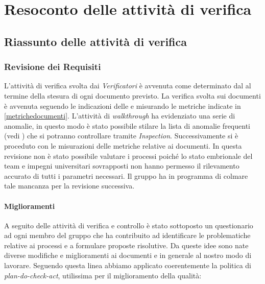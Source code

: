 \section{Resoconto delle attività di verifica}

	\subsection{Riassunto delle attività di verifica}
	\label{RiassuntoAttivitaVerifica}
	
	 	\subsubsection{Revisione dei Requisiti}
	 	L'attività di verifica svolta dai \emph{Verificatori} è avvenuta come determinato dal \PianoDiProgetto{} al termine della stesura di ogni documento previsto. La verifica svolta sui documenti è avvenuta seguendo le indicazioni delle \NormeDiProgetto{} e misurando le metriche indicate in \ref{metrichedocumenti}. L'attività di \emph{walkthrough} ha evidenziato una serie di anomalie, in questo modo è stato possibile stilare la lista di anomalie frequenti (vedi \NormeDiProgetto{}) che si potranno controllare tramite \emph{Inspection}. Successivamente si è proceduto con le misurazioni delle metriche relative ai documenti.
In questa revisione non è stato possibile valutare i processi poiché lo stato embrionale del team e   impegni universitari sovrapposti non hanno permesso il rilevamento accurato di tutti i parametri necessari. Il gruppo ha in programma di colmare tale mancanza per la revisione successiva.

		\paragraph{Miglioramenti}
		A seguito delle attività di verifica e controllo è stato sottoposto un questionario ad ogni membro del gruppo che ha contribuito ad identificare le problematiche relative ai processi e a formulare proposte risolutive. Da queste idee sono nate diverse modifiche e miglioramenti ai documenti e in generale al nostro modo di lavorare. Seguendo questa linea abbiamo applicato coerentemente la politica di \textit{plan-do-check-act}, utilissima per il miglioramento della qualità: \\
			
